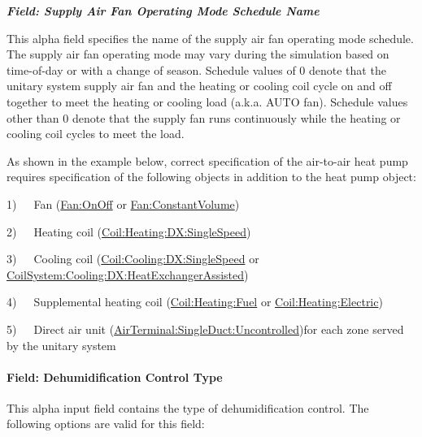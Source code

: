 \textbf{\emph{Field: Supply Air Fan Operating Mode Schedule Name}}

This alpha field specifies the name of the supply air fan operating mode schedule. The supply air fan operating mode may vary during the simulation based on time-of-day or with a change of season. Schedule values of 0 denote that the unitary system supply air fan and the heating or cooling coil cycle on and off together to meet the heating or cooling load (a.k.a. AUTO fan). Schedule values other than 0 denote that the supply fan runs continuously while the heating or cooling coil cycles to meet the load.

As shown in the example below, correct specification of the air-to-air heat pump requires specification of the following objects in addition to the heat pump object:

1)~~~Fan (\hyperref[fanonoff]{Fan:OnOff} or \hyperref[fanconstantvolume]{Fan:ConstantVolume})

2)~~~Heating coil (\hyperref[coilheatingdxsinglespeed]{Coil:Heating:DX:SingleSpeed})

3)~~~Cooling coil (\hyperref[coilcoolingdxsinglespeed]{Coil:Cooling:DX:SingleSpeed} or \hyperref[coilsystemcoolingdxheatexchangerassisted]{CoilSystem:Cooling:DX:HeatExchangerAssisted})

4)~~~Supplemental heating coil (\hyperref[coilheatinggas-000]{Coil:Heating:Fuel} or \hyperref[coilheatingelectric]{Coil:Heating:Electric})

5)~~~Direct air unit (\hyperref[airterminalsingleductuncontrolled]{AirTerminal:SingleDuct:Uncontrolled})for each zone served by the unitary system

\paragraph{Field: Dehumidification Control Type}\label{field-dehumidification-control-type-3-000}

This alpha input field contains the type of dehumidification control. The following options are valid for this field:

